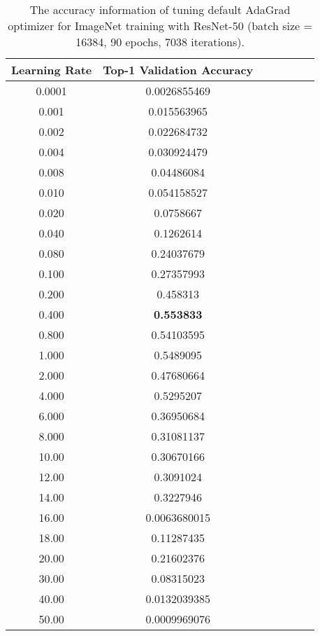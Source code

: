 \documentclass{article} \usepackage{iclr2020_conference,times}
\begin{document}
\begin{table}[ht]
\renewcommand{\arraystretch}{1.3}
\caption{The accuracy information of tuning default AdaGrad optimizer for ImageNet training with ResNet-50 (batch size = 16384, 90 epochs, 7038 iterations).}
\centering
\begin{tabular}{|c|c|c|c|c|c|c|}
\hline
Learning Rate & Top-1 Validation Accuracy \\
\hline
\hline
0.0001 & 0.0026855469 \\
\hline
0.001 & 0.015563965 \\
\hline
0.002 & 0.022684732 \\
\hline
0.004 & 0.030924479 \\
\hline
0.008 & 0.04486084 \\
\hline
0.010 & 0.054158527 \\
\hline
0.020 & 0.0758667 \\
\hline
0.040 & 0.1262614 \\
\hline
0.080 & 0.24037679 \\
\hline
0.100 & 0.27357993 \\
\hline
0.200 & 0.458313 \\
\hline
0.400 & {\bf 0.553833} \\
\hline
0.800 & 0.54103595 \\
\hline
1.000 & 0.5489095 \\
\hline
2.000 & 0.47680664 \\
\hline
4.000 & 0.5295207 \\
\hline
6.000 & 0.36950684 \\
\hline
8.000 & 0.31081137 \\
\hline
10.00 & 0.30670166 \\
\hline
12.00 & 0.3091024 \\
\hline
14.00 & 0.3227946 \\
\hline
16.00 & 0.0063680015 \\
\hline
18.00 & 0.11287435 \\
\hline
20.00 & 0.21602376 \\
\hline
30.00 & 0.08315023 \\
\hline
40.00 & 0.0132039385 \\
\hline
50.00 & 0.0009969076 \\
\hline
\end{tabular}
\label{table:imagenet_adagrad_tuning_1}
\end{table}
\end{document}
